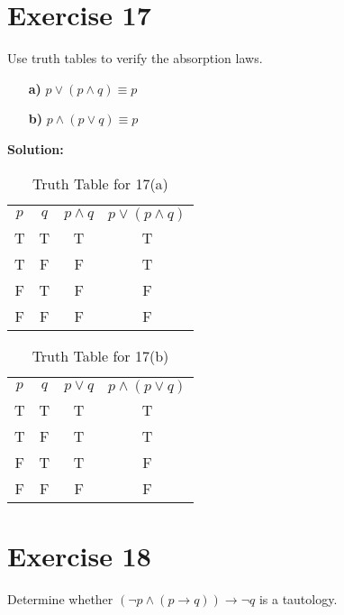 \documentclass{Axon}
\begin{document}
\section*{Exercise 17}
Use truth tables to verify the absorption laws.
\begin{enumerate}
    \item[\textbf{a)}] \(p \lor (p \land q) \equiv p\)
    \item[\textbf{b)}] \(p \land (p \lor q) \equiv p\)
\end{enumerate}

\noindent
\textbf{Solution:}
\begin{table}[ht]
    \centering
    \begin{tabular}{c|c|c|c}
        \(p\) & \(q\) & \(p \land q\) & \(p \lor (p \land q)\) \\
        T     & T     & T             & T                      \\
        T     & F     & F             & T                      \\
        F     & T     & F             & F                      \\
        F     & F     & F             & F
    \end{tabular}
    \caption{Truth Table for 17(a)}
\end{table}

\begin{table}[ht]
    \centering
    \begin{tabular}{c|c|c|c}
        \(p\) & \(q\) & \(p \lor q\) & \(p \land (p \lor q)\) \\
        T     & T     & T            & T                      \\
        T     & F     & T            & T                      \\
        F     & T     & T            & F                      \\
        F     & F     & F            & F
    \end{tabular}
    \caption{Truth Table for 17(b)}
\end{table}

\section*{Exercise 18}
Determine whether \((\lnot p \land(p \to q)) \to \lnot q\) is a tautology.
\end{document}
